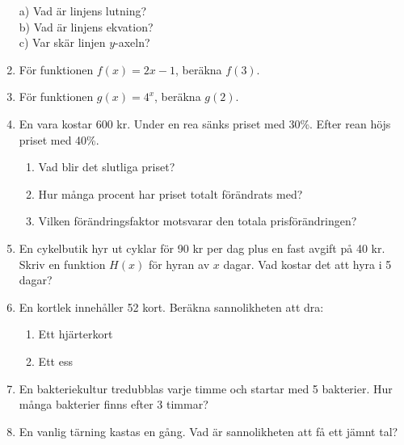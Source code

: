 \documentclass[a4paper,11pt]{article}
\begin{document}
\begin{enumerate}[label=\textbf{\arabic*.}]
\begin{center}
    \end{center}
    a) Vad är linjens lutning? \\
    b) Vad är linjens ekvation? \\
    c) Var skär linjen $y$-axeln? \\
    \item För funktionen $f(x) = 2x - 1$, beräkna $f(3)$.
    \item För funktionen $g(x) = 4^x$, beräkna $g(2)$.
    \item En vara kostar 600 kr. Under en rea sänks priset med 30\%. Efter rean höjs priset med 40\%.
    \begin{enumerate}[label=\alph*)]
        \item Vad blir det slutliga priset?
        \item Hur många procent har priset totalt förändrats med?
        \item Vilken förändringsfaktor motsvarar den totala prisförändringen?
    \end{enumerate}
    \item En cykelbutik hyr ut cyklar för 90 kr per dag plus en fast avgift på 40 kr. Skriv en funktion $H(x)$ för hyran av $x$ dagar. Vad kostar det att hyra i 5 dagar?
    \item En kortlek innehåller 52 kort. Beräkna sannolikheten att dra:
    \begin{enumerate}[label=\alph*)]
        \item Ett hjärterkort
        \item Ett ess
    \end{enumerate}
    \item En bakteriekultur tredubblas varje timme och startar med 5 bakterier. Hur många bakterier finns efter 3 timmar?
    \item En vanlig tärning kastas en gång. Vad är sannolikheten att få ett jämnt tal?
\end{enumerate}

\newpage
\end{document}
